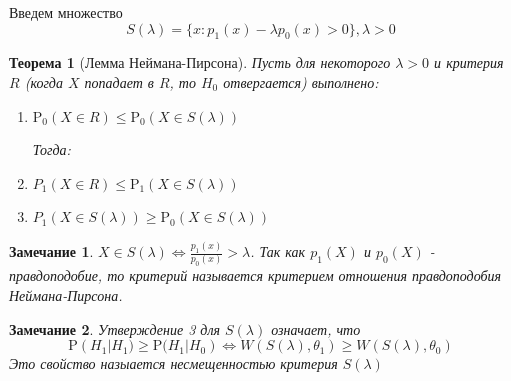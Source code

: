 \documentclass[12pt]{article}
\newtheorem*{remark}{Замечание}
\theoremstyle{basic_theorem}
\newtheorem{theorem}{Теорема}
\theoremstyle{name_theorem}
\def\P{
    \mathrm{P}
}
\begin{document}
Введем множество
$$S(\lambda) = \{x: p_1(x) - \lambda p_0(x) > 0\}, \lambda > 0$$

\begin{theorem}[Лемма Неймана-Пирсона]
    \label{th::lemma_N_P}
    Пусть для некоторого $\lambda > 0$ и критерия $R$
    (когда $X$ попадает в $R$, то $H_0$ отвергается)
    выполнено:
    \begin{enumerate}
        \item  $\P_0(X\in R) \leq \P_0(X\in S(\lambda))$

        Тогда: 
        \item  $P_1(X\in R) \leq \P_1(X\in S(\lambda))$
        \item  $P_1(X\in S(\lambda)) \geq \P_0(X\in S(\lambda))$
    \end{enumerate}
\end{theorem}
\begin{remark}
    $X\in S(\lambda) \Leftrightarrow \frac{p_1(x)}{p_0(x)} > \lambda$.
    Так как $p_1(X)$ и $p_0(X)$ - правдоподобие, то критерий
    называется критерием отношения правдоподобия Неймана-Пирсона.
\end{remark}
\begin{remark}
    Утверждение 3 для $S(\lambda)$
    означает, что
    $$\P(H_1 \left\lvert  H_1) \geq \P(H_1 \right\rvert H_0) \Leftrightarrow W(S(\lambda), \theta_1) \geq W(S(\lambda), \theta_0)$$
    Это свойство назыается несмещенностью критерия $S(\lambda)$
\end{remark}
\end{document}

